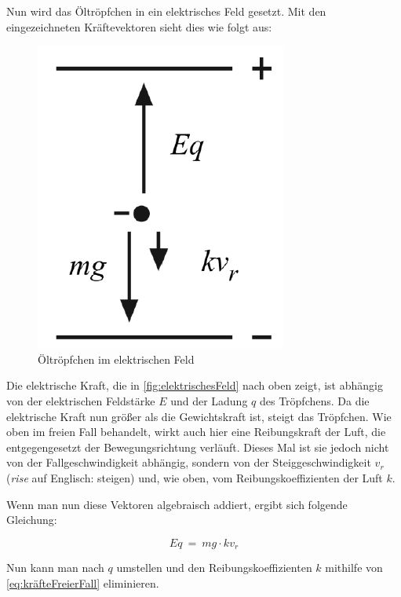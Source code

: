 \noindent Nun wird das Öltröpfchen in ein elektrisches Feld gesetzt. Mit den eingezeichneten Kräftevektoren sieht dies wie folgt aus:

\begin{figure}[h]
	\begin{center}
		\includegraphics[scale=0.5]{bilder/pdf/Abbildung2_elektrischesFeld.pdf}
		\caption{Öltröpfchen im elektrischen Feld}
		\label{fig:elektrischesFeld}
	\end{center}
\end{figure}

\noindent Die elektrische Kraft, die in \autoref{fig:elektrischesFeld} nach oben zeigt, ist abhängig von der elektrischen Feldstärke $E$ und der Ladung $q$ des Tröpfchens. Da die elektrische Kraft nun größer als die Gewichtskraft ist, steigt das Tröpfchen. Wie oben im freien Fall behandelt, wirkt auch hier eine Reibungskraft der Luft, die entgegengesetzt der Bewegungsrichtung verläuft. Dieses Mal ist sie jedoch nicht von der Fallgeschwindigkeit abhängig, sondern von der Steiggeschwindigkeit $v_r$ (\textit{rise} auf Englisch: steigen) und, wie oben, vom Reibungskoeffizienten der Luft $k$.

Wenn man nun diese Vektoren algebraisch addiert, ergibt sich folgende Gleichung:

\begin{equation}\label{eq:elektrischesFeld}
	Eq \ = \ mg \cdot kv_r
\end{equation}

\noindent Nun kann man nach $q$ umstellen und den Reibungskoeffizienten $k$ mithilfe von \autoref{eq:kräfteFreierFall} eliminieren. 

